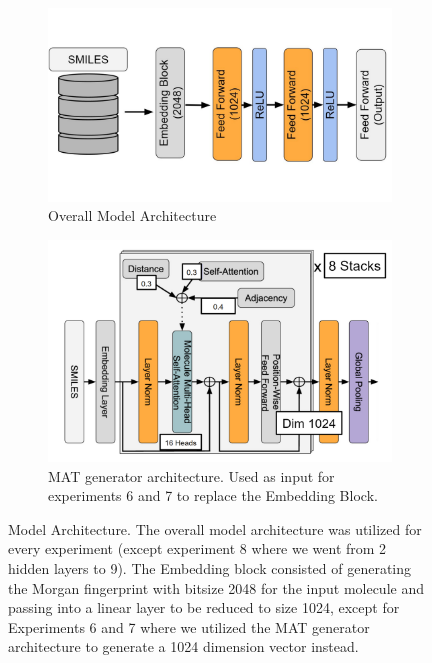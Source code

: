 \documentclass[journal=jmcmar,manuscript=article]{achemso}
\begin{document}
\begin{figure}[tbph]
    \centering
    \begin{subfigure}[b]{0.48\textwidth}
        \includegraphics[width=1\linewidth]{figures/general_architecture.pdf}
        \caption{Overall Model Architecture}
    \end{subfigure}%
    \hfill
    \begin{subfigure}[b]{0.48\textwidth}
        \includegraphics[width=1\linewidth]{figures/MAT_encoder.PNG}
        \caption{MAT generator architecture. Used as input for experiments 6 and 7 to replace the Embedding Block.}
    \end{subfigure}
    \caption{Model Architecture. The overall model architecture was utilized for every experiment (except experiment 8 where we went from 2 hidden layers to 9). The Embedding block consisted of generating the Morgan fingerprint with bitsize 2048 for the input molecule and passing into a linear layer to be reduced to size 1024, except for Experiments 6 and 7 where we utilized the MAT generator architecture to generate a 1024 dimension vector instead.}
    \label{fig:architectures}
\end{figure}
\end{document}
